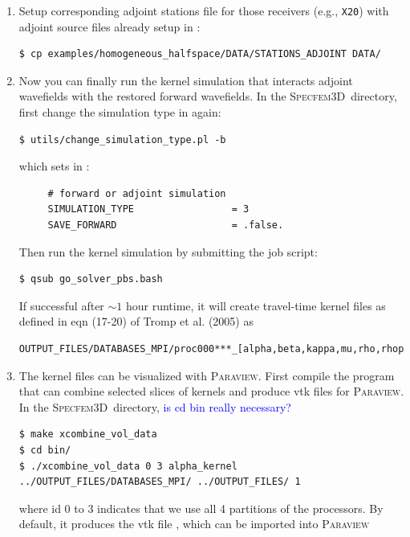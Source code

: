 \documentclass[10pt,fleqn,letterpaper]{article}
\newcommand{\specfem}{\textsc{Specfem3D}}
\newcommand{\paraview}{\textsc{Paraview}}
\newcommand{\blue}[1]{\textcolor{blue}{#1}}
\begin{document}
\begin{enumerate}
\item Setup corresponding adjoint stations file  for those receivers (e.g., \verb+X20+) with adjoint source files already setup in :

\begin{lstlisting}
$ cp examples/homogeneous_halfspace/DATA/STATIONS_ADJOINT DATA/
\end{lstlisting}


\item Now you can finally run the kernel simulation that interacts adjoint wavefields with the restored forward wavefields. In the \specfem\ directory, first change the simulation type in  again:

\begin{lstlisting}
$ utils/change_simulation_type.pl -b
\end{lstlisting}

which sets in :

\begin{lstlisting}
     # forward or adjoint simulation
     SIMULATION_TYPE                 = 3
     SAVE_FORWARD                    = .false.
\end{lstlisting}
Then run the kernel simulation by submitting the job script:
\begin{lstlisting}
$ qsub go_solver_pbs.bash
\end{lstlisting}


If successful after $\sim 1$ hour runtime, it will create  travel-time kernel files as defined in eqn (17-20) of Tromp et al. (2005) as 
\begin{lstlisting}
OUTPUT_FILES/DATABASES_MPI/proc000***_[alpha,beta,kappa,mu,rho,rhop]_kernel.bin
\end{lstlisting}


\item The kernel files can be visualized with \paraview. First compile the program that can combine selected slices of kernels and produce vtk files for \paraview. In the \specfem\ directory, \blue{is cd bin really necessary?}

\begin{lstlisting}
$ make xcombine_vol_data
$ cd bin/ 
$ ./xcombine_vol_data 0 3 alpha_kernel ../OUTPUT_FILES/DATABASES_MPI/ ../OUTPUT_FILES/ 1
\end{lstlisting}

where id 0 to 3 indicates that we use all 4 partitions of the processors. By default, it produces the vtk file , which can be imported into \paraview



\end{enumerate}
\end{document}
